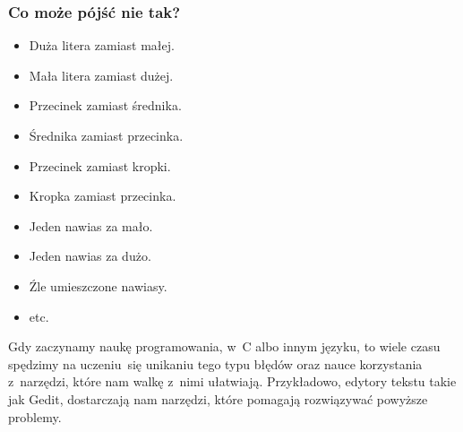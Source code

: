 \documentclass[10pt,t]{beamer}
\begin{document}
\begin{frame}
  \frametitle{Co może pójść nie tak?}


  \begin{itemize}

  \item Duża litera zamiast małej.

  \item Mała litera zamiast dużej.

  \item Przecinek zamiast średnika.

  \item Średnika zamiast przecinka.

  \item Przecinek zamiast kropki.

  \item Kropka zamiast przecinka.

  \item Jeden nawias za mało.

  \item Jeden nawias za dużo.

  \item Źle umieszczone nawiasy.

  \item etc.

  \end{itemize}



  Gdy zaczynamy naukę programowania, w~C albo innym języku, to wiele czasu
  spędzimy na uczeniu~się unikaniu tego typu błędów oraz nauce korzystania
  z~narzędzi, które nam walkę z~nimi ułatwiają. Przykładowo, edytory
  tekstu takie jak Gedit, dostarczają nam narzędzi, które pomagają
  rozwiązywać powyższe problemy.

\end{frame}
\end{document}
